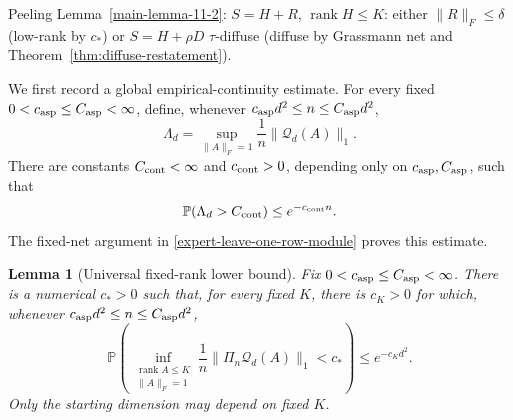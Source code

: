 \documentclass[11pt]{article}
\numberwithin{equation}{section}
\newtheorem{lemma}[theorem]{Lemma}
\theoremstyle{definition}
\theoremstyle{remark}
\newcommand{\Pp}{\mathbb P}
\newcommand{\1}{\boldsymbol 1}
\newcommand{\PiZero}{\Pi_n}
\newcommand{\rank}{\operatorname{rank}}
\begin{document}
\begin{aiblock}
 
Peeling Lemma~\ref{main-lemma-11-2}: $S=H+R$, $\rank H\le K$:
either $\|R\|_F\le\delta$ (low-rank by $c_*$)
or $S=H+\rho D$ $\tau$-diffuse (diffuse by
Grassmann net and Theorem~\ref{thm:diffuse-restatement}).

We first record a global empirical-continuity
estimate.
For every fixed $0<c_{\rm asp}\le C_{\rm asp}<\infty$,
define, whenever $c_{\rm asp}d^2\le n\le C_{\rm asp}d^2$,
\[
  \Lambda_d=\sup_{\|A\|_F=1}\frac1n\|\mathcal Q_d(A)\|_1.
\]
There are constants $C_{\rm cont}<\infty$ and
$c_{\rm cont}>0$, depending only on $c_{\rm asp},C_{\rm asp}$,
such that
\[
  \Pp(\Lambda_d>C_{\rm cont})\le e^{-c_{\rm cont}n}.
\]
The fixed-net argument in
\cref{expert-leave-one-row-module} proves this estimate.

\begin{lemma}[Universal fixed-rank lower
  bound]\label{main-lemma-11-1}
  Fix $0<c_{\rm asp}\le C_{\rm asp}<\infty$. There is a
  numerical $c_*>0$ such that, for every fixed $K$, there
  is $c_K>0$ for which, whenever $c_{\rm asp}d^2\le n\le
  C_{\rm asp}d^2$,
  \[
    \Pp\left( \inf_{\substack{\operatorname{rank}A\le
    K\\\|A\|_F=1}} \frac1n\|\PiZero\mathcal{Q}_d(A)\|_1<c_*
    \right)\le e^{-c_Kd^2}.
  \]
  Only the starting dimension may depend on fixed $K$.
\end{lemma}


\end{aiblock}
\end{document}
